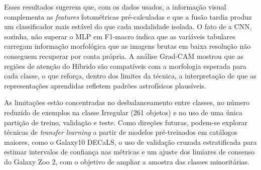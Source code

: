 \documentclass[12pt, a4paper]{article}
\begin{document}
Esses resultados sugerem que, com os dados usados, a informação visual
complementa as \textit{features} fotométricas pré-calculadas e que a
fusão tardia produz um classificador mais estável do que cada
modalidade isolada. O fato de a CNN, sozinha, não superar o MLP em
F1-macro indica que as variáveis tabulares carregam informação
morfológica que as imagens brutas em baixa resolução não conseguem
recuperar por conta própria. A análise Grad-CAM mostrou que as regiões
de atenção do Híbrido são compatíveis com a morfologia esperada para
cada classe, o que reforça, dentro dos limites da técnica, a
interpretação de que as representações aprendidas refletem padrões
astrofísicos plausíveis.

As limitações estão concentradas no desbalanceamento entre classes,
no número reduzido de exemplos na classe Irregular (261 objetos) e no
uso de uma única partição de treino, validação e teste. Como direções
futuras, podem-se explorar técnicas de \textit{transfer learning} a
partir de modelos pré-treinados em catálogos maiores, como o
Galaxy10 DECaLS, o uso de validação cruzada estratificada para
estimar intervalos de confiança nas métricas e um ajuste dos limiares
de consenso do Galaxy Zoo 2, com o objetivo de ampliar a amostra das
classes minoritárias.
\end{document}
